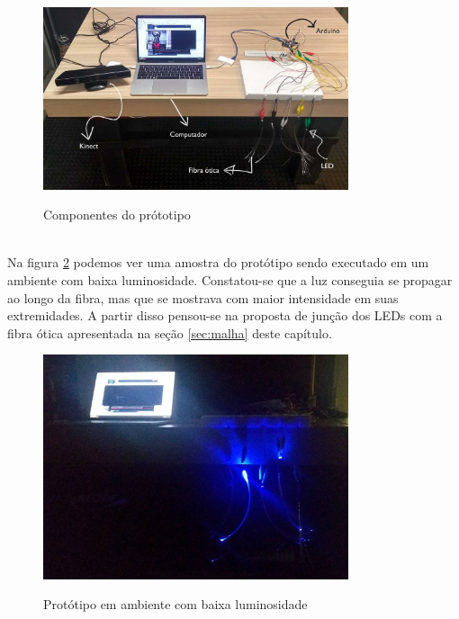 \begin{figure}[H]
    \centering
    \caption{Componentes do prótotipo}
	\vspace*{0,2cm}
    \includegraphics[width=0.8\textwidth]{./04-figuras/prototipo}
    \label{fig:prototipo}
\end{figure}
\vspace*{-0,9cm}
{\raggedright {}}\\

Na figura \ref{fig:prototipo-escuro} podemos ver uma amostra do protótipo sendo executado em um ambiente com baixa luminosidade. Constatou-se que a luz conseguia se propagar ao longo da fibra, mas que se mostrava com maior intensidade em suas extremidades. A partir disso pensou-se na proposta de junção dos LEDs com a fibra ótica apresentada na seção \ref{sec:malha} deste capítulo.
 
\begin{figure}[H]
    \centering
    \caption{Protótipo em ambiente com baixa luminosidade}
	\vspace*{0,2cm}
    \includegraphics[width=0.8\textwidth]{./04-figuras/prototipo_escuro}
    \label{fig:prototipo-escuro}
\end{figure}
\vspace*{-0,9cm}
{\raggedright {}}\\

